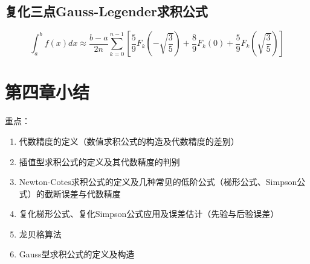 \subsection{复化三点Gauss-Legender求积公式}
\begin{equation*}
    \int_{a}^{b}f(x)dx \approx \frac{b-a}{2n}\sum_{k=0}^{n-1}[\frac{5}{9}F_k(-\sqrt{\frac{3}{5}})+\frac{8}{9}F_k(0)+\frac{5}{9}F_k(\sqrt{\frac{3}{5}})]
\end{equation*}


\section{第四章小结}
重点：
\begin{enumerate}
    \item 代数精度的定义（数值求积公式的构造及代数精度的差别）
    \item 插值型求积公式的定义及其代数精度的判别
    \item Newton-Cotes求积公式的定义及几种常见的低阶公式（梯形公式、Simpson公式）的截断误差与代数精度
    \item 复化梯形公式、复化Simpson公式应用及误差估计（先验与后验误差）
    \item 龙贝格算法
    \item Gauss型求积公式的定义及构造
\end{enumerate}